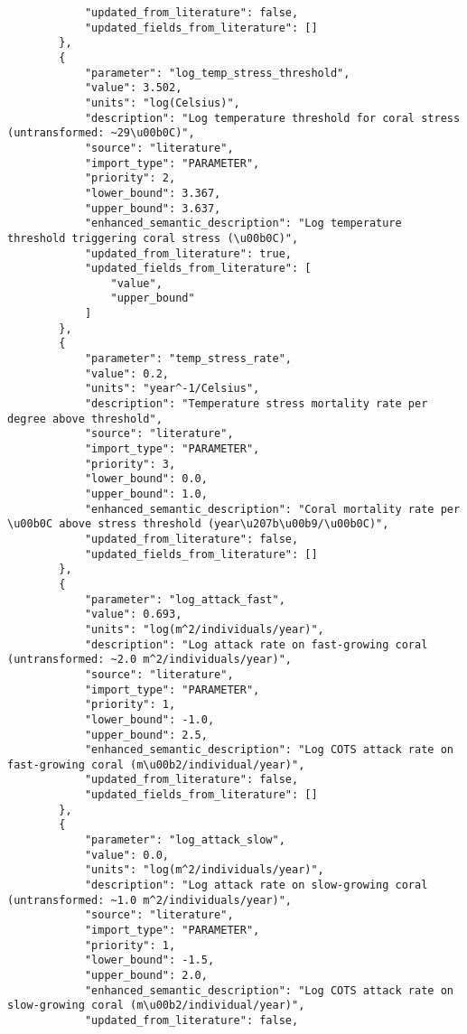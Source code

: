 \begin{lstlisting}
            "updated_from_literature": false,
            "updated_fields_from_literature": []
        },
        {
            "parameter": "log_temp_stress_threshold",
            "value": 3.502,
            "units": "log(Celsius)",
            "description": "Log temperature threshold for coral stress (untransformed: ~29\u00b0C)",
            "source": "literature",
            "import_type": "PARAMETER",
            "priority": 2,
            "lower_bound": 3.367,
            "upper_bound": 3.637,
            "enhanced_semantic_description": "Log temperature threshold triggering coral stress (\u00b0C)",
            "updated_from_literature": true,
            "updated_fields_from_literature": [
                "value",
                "upper_bound"
            ]
        },
        {
            "parameter": "temp_stress_rate",
            "value": 0.2,
            "units": "year^-1/Celsius",
            "description": "Temperature stress mortality rate per degree above threshold",
            "source": "literature",
            "import_type": "PARAMETER",
            "priority": 3,
            "lower_bound": 0.0,
            "upper_bound": 1.0,
            "enhanced_semantic_description": "Coral mortality rate per \u00b0C above stress threshold (year\u207b\u00b9/\u00b0C)",
            "updated_from_literature": false,
            "updated_fields_from_literature": []
        },
        {
            "parameter": "log_attack_fast",
            "value": 0.693,
            "units": "log(m^2/individuals/year)",
            "description": "Log attack rate on fast-growing coral (untransformed: ~2.0 m^2/individuals/year)",
            "source": "literature",
            "import_type": "PARAMETER",
            "priority": 1,
            "lower_bound": -1.0,
            "upper_bound": 2.5,
            "enhanced_semantic_description": "Log COTS attack rate on fast-growing coral (m\u00b2/individual/year)",
            "updated_from_literature": false,
            "updated_fields_from_literature": []
        },
        {
            "parameter": "log_attack_slow",
            "value": 0.0,
            "units": "log(m^2/individuals/year)",
            "description": "Log attack rate on slow-growing coral (untransformed: ~1.0 m^2/individuals/year)",
            "source": "literature",
            "import_type": "PARAMETER",
            "priority": 1,
            "lower_bound": -1.5,
            "upper_bound": 2.0,
            "enhanced_semantic_description": "Log COTS attack rate on slow-growing coral (m\u00b2/individual/year)",
            "updated_from_literature": false,

\end{lstlisting}
